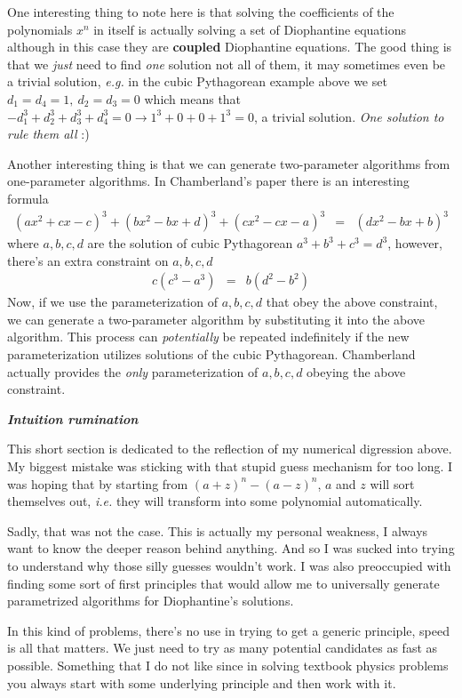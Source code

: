 \documentclass[aps,preprint,preprintnumbers,nofootinbib,showpacs,prd]{revtex4-1}
\newcommand{\ie}{{\it i.e.} }
\newcommand{\eg}{{\it e.g.} }
\newcommand{\nbea}{\begin{eqnarray*}}
\newcommand{\neea}{\end{eqnarray*}}
\begin{document}
One interesting thing to note here is that solving the coefficients of the polynomials $x^n$ in itself is actually solving a set of Diophantine equations although in this case they are {\bf coupled} Diophantine equations. The good thing is that we {\it just} need to find {\it one} solution not all of them, it may sometimes even be a trivial solution, \eg in the cubic Pythagorean example above we set $d_1 = d_4 = 1,~d_2 = d_3 = 0$ which means that $-d_1^3 + d_2^3 + d_3^3 + d_4^3 = 0 \to 1^3 + 0 + 0 + 1^3 = 0$, a trivial solution. {\it One solution to rule them all} :)

Another interesting thing is that we can generate two-parameter algorithms from one-parameter algorithms. In Chamberland's paper there is an interesting formula
%
\nbea
(a x^2 + cx - c)^3 + (b x^2 - bx + d)^3 + (c x^2 - cx - a)^3 & = & (d x^2 - bx + b)^3
\neea
%
where $a,b,c,d$ are the solution of cubic Pythagorean $a^3 + b^3 + c^3 = d^3$, however, there's an extra constraint on $a,b,c,d$
%
\nbea
c(c^3 - a^3) & = & b(d^2 - b^2)
\neea
%
Now, if we use the parameterization of $a,b,c,d$ that obey the above constraint, we can generate a two-parameter algorithm by substituting it into the above algorithm. This process can {\it potentially} be repeated indefinitely if the new parameterization utilizes solutions of the cubic Pythagorean. Chamberland actually provides the {\it only} parameterization of $a,b,c,d$ obeying the above constraint.

\bigskip\textbf{\textit{Intuition rumination}}

This short section is dedicated to the reflection of my numerical digression above. My biggest mistake was sticking with that stupid guess mechanism for too long. I was hoping that by starting from $(a+z)^n - (a-z)^n$, $a$ and $z$ will sort themselves out, \ie they will transform into some polynomial automatically.

Sadly, that was not the case. This is actually my personal weakness, I always want to know the deeper reason behind anything. And so I was sucked into trying to understand why those silly guesses wouldn't work. I was also preoccupied with finding some sort of first principles that would allow me to universally generate parametrized algorithms for Diophantine's solutions.

In this kind of problems, there's no use in trying to get a generic principle, speed is all that matters. We just need to try as many potential candidates as fast as possible. Something that I do not like since in solving textbook physics problems you always start with some underlying principle and then work with it.
\end{document}
